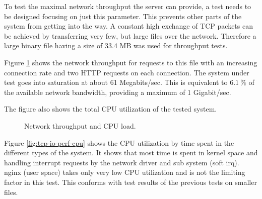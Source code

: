 To test the maximal network throughput the server can provide, a test needs to be designed focusing on just this parameter. This prevents other parts of the system from getting into the way. A constant high exchange of TCP packets can be achieved by transferring very few, but large files over the network. Therefore a large binary file having a size of 33.4 MB was used for throughput tests.

Figure \ref{fig:tcp-io-perf} shows the network throughput for requests to this file with an increasing connection rate and two HTTP requests on each connection. The system under test goes into saturation at about 61 Megabits/sec. This is equivalent to $6.1\ \%$ of the available network bandwidth, providing a maximum of 1 Gigabit/sec.

The figure also shows the total CPU utilization of the tested system.

\begin{figure}[H]
	\centering
  \caption{Network throughput and CPU load.}
  \label{fig:tcp-io-perf}
\end{figure}

Figure \ref{fig:tcp-io-perf-cpu} shows the CPU utilization by time spent in the different types of the system. It shows that most time is spent in kernel space and handling interrupt requests by the network driver and sub system (soft irq). nginx (user space) takes only very low CPU utilization and is not the limiting factor in this test. This conforms with test results of the previous tests on smaller files.


